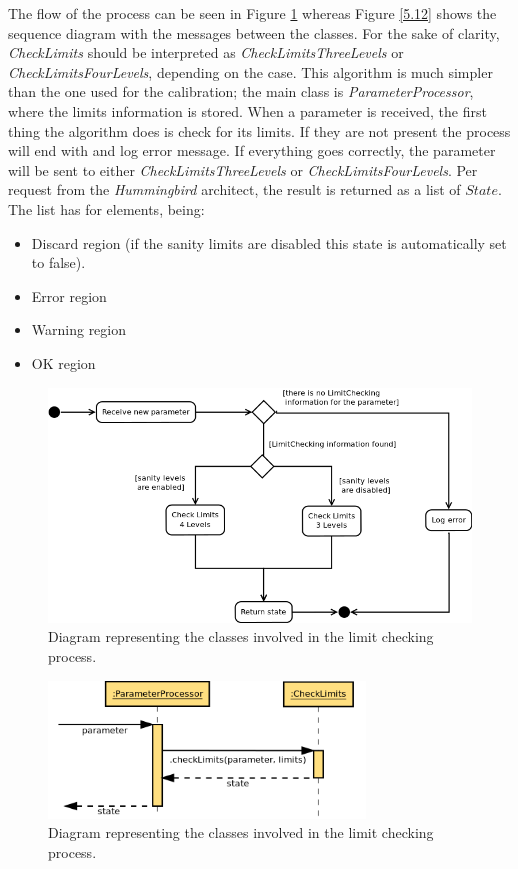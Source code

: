 The flow of the process can be seen in Figure \ref{f5.11} whereas Figure \ref{5.12} shows the sequence diagram with the messages between the classes. For the sake of clarity, \emph{CheckLimits} should be interpreted as \emph{CheckLimitsThreeLevels} or \emph{CheckLimitsFourLevels}, depending on the case. This algorithm is much simpler than the one used for the calibration; the main class is \emph{ParameterProcessor}, where the limits information is stored. When a parameter is received, the first thing the algorithm does is check for its limits. If they are not present the process will end with and log error message. If everything goes correctly, the parameter will be sent to either \emph{CheckLimitsThreeLevels} or \emph{CheckLimitsFourLevels}.
Per request from the \emph{Hummingbird} architect, the result is returned as a list of $State$. The list has for elements, being:
\begin{itemize}
\item Discard region (if the sanity limits are disabled this state is automatically set to false).
\item Error region
\item Warning region
\item OK region
\end{itemize}

\begin{figure}[H]
\centerline{\includegraphics[width=1\textwidth]{images/LimitCheckingFlowChart.png}}
\caption{Diagram representing the classes involved in the limit checking process.}
\label{f5.11}
\end{figure}


\begin{figure}[H]
\centerline{\includegraphics[width=0.75\textwidth]{images/CheckLimitsSequence.png}}
\caption{Diagram representing the classes involved in the limit checking process.}
\label{f5.12}
\end{figure}






